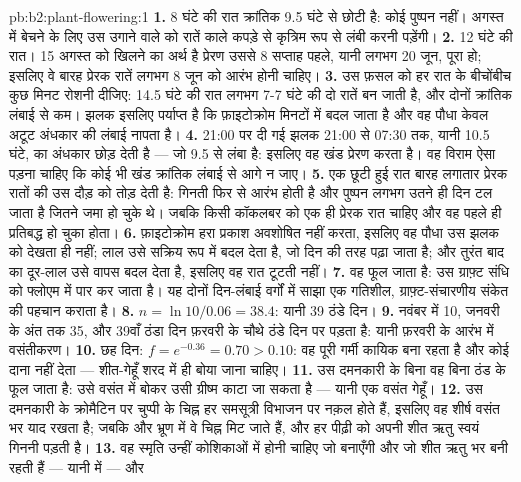 \begin{solution}{pb:b2:plant-flowering:1}
\textbf{1.} 8 घंटे की रात क्रांतिक 9.5 घंटे से छोटी है:
कोई पुष्पन नहीं। अगस्त में बेचने के लिए उस उगाने वाले को रातें काले
कपड़े से कृत्रिम रूप से लंबी करनी पड़ेंगी।
\textbf{2.} 12 घंटे की रात। 15 अगस्त को खिलने का अर्थ है प्रेरण उससे
8 सप्ताह पहले, यानी लगभग 20 जून, पूरा हो; इसलिए वे बारह प्रेरक
रातें लगभग 8 जून को आरंभ होनी चाहिए।
\textbf{3.} उस फ़सल को हर रात के बीचोंबीच कुछ मिनट रोशनी दीजिए:
14.5 घंटे की रात लगभग 7-7 घंटे की दो रातें बन जाती है, और दोनों
क्रांतिक लंबाई से कम। झलक इसलिए पर्याप्त है कि फ़ाइटोक्रोम
मिनटों में बदल जाता है और वह पौधा केवल अटूट अंधकार की लंबाई नापता है।
\textbf{4.} 21:00 पर दी गई झलक 21:00 से 07:30 तक,
यानी 10.5 घंटे, का अंधकार छोड़ देती है --- जो 9.5 से लंबा है:
इसलिए वह खंड प्रेरण करता है। वह विराम ऐसा पड़ना चाहिए कि कोई भी खंड
क्रांतिक लंबाई से आगे न जाए।
\textbf{5.} एक छूटी हुई रात बारह लगातार प्रेरक रातों की उस दौड़ को तोड़
देती है: गिनती फिर से आरंभ होती है और पुष्पन लगभग उतने ही दिन टल जाता है
जितने जमा हो चुके थे। जबकि किसी कॉकलबर को एक ही प्रेरक रात चाहिए और वह
पहले ही प्रतिबद्ध हो चुका होता।
\textbf{6.} फ़ाइटोक्रोम हरा प्रकाश अवशोषित नहीं करता, इसलिए वह पौधा
उस झलक को देखता ही नहीं; लाल उसे सक्रिय रूप में बदल देता है, जो
दिन की तरह पढ़ा जाता है; और तुरंत बाद का दूर-लाल उसे वापस बदल देता है,
इसलिए वह रात टूटती नहीं।
\textbf{7.} वह  फूल जाता है:  उस ग्राफ़्ट
संधि को फ्लोएम में पार कर जाता है। यह दोनों दिन-लंबाई वर्गों में साझा
एक गतिशील, ग्राफ़्ट-संचारणीय संकेत की पहचान कराता है।
\textbf{8.} $n = \ln 10/0.06 = 38.4$: यानी 39 ठंडे दिन।
\textbf{9.} नवंबर में 10, जनवरी के अंत तक 35, और 39वाँ
ठंडा दिन फ़रवरी के चौथे ठंडे दिन पर पड़ता है: यानी फ़रवरी के आरंभ में
वसंतीकरण।
\textbf{10.} छह दिन: $f = e^{-0.36} = 0.70 > 0.10$: वह पूरी गर्मी
कायिक बना रहता है और कोई दाना नहीं देता --- शीत-गेहूँ
शरद में ही बोया जाना चाहिए।
\textbf{11.} उस दमनकारी के बिना वह बिना ठंड के फूल जाता है: उसे
वसंत में बोकर उसी ग्रीष्म काटा जा सकता है --- यानी एक वसंत गेहूँ।
\textbf{12.} उस दमनकारी के क्रोमैटिन पर चुप्पी के चिह्न हर समसूत्री
विभाजन पर नक़ल होते हैं, इसलिए वह शीर्ष वसंत भर याद रखता है; जबकि
 और भ्रूण में वे चिह्न मिट जाते हैं, और हर पीढ़ी को
अपनी शीत ऋतु स्वयं गिननी पड़ती है।
\textbf{13.} वह स्मृति उन्हीं कोशिकाओं में होनी चाहिए जो
 बनाएँगी और जो शीत ऋतु भर बनी रहती हैं --- यानी  में --- और

\end{solution}
